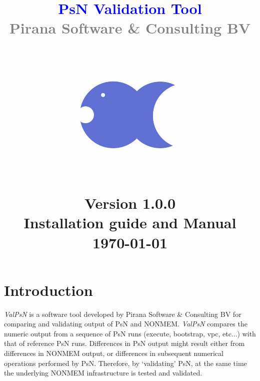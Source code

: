 \documentclass[a4,11pt]{report} \usepackage[pdftex]{graphicx}
\newcommand{\ValPsN}{\textcolor{PiranaOrange}{\textit{ValPsN}}\xspace}
\begin{document}
\title{
  \vspace{-100pt}
  \textbf{
  \textcolor{Blue}{\Large PsN Validation Tool}
  }\\
  \vspace{5pt}
  \scriptsize \textcolor{Grey}{Pirana Software \& Consulting BV} \\
  \normalsize
  \vspace{15pt}
  \hspace{15pt}\includegraphics[scale=0.15]{images/pirana_logo_blue.jpg}\\
  \vspace{15pt}
  \scriptsize Version 1.0.0\\Installation guide and Manual \\
  \vspace{5pt}
  \scriptsize {\today} \\
  \date{}
}
\maketitle

\tableofcontents

\chapter{Introduction}

\ValPsN is a software tool developed by Pirana Software \& Consulting
BV for comparing and validating output of PsN and NONMEM. \ValPsN
compares the numeric output from a sequence of PsN runs (execute,
bootstrap, vpc, etc...) with that of reference PsN runs. Differences in
PsN output might result either from differences in NONMEM output, or
differences in subsequent numerical operations performed by
PsN. Therefore, by `validating' PsN, at the same time the
underlying NONMEM infrastructure is tested and validated.
\end{document}
